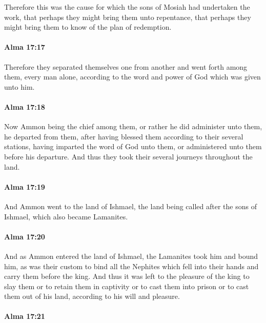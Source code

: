 			Therefore this was the cause
			for which the sons of Mosiah had undertaken the work,
			that perhaps they might bring them unto repentance,
			that perhaps they might bring them to know of the plan of redemption.

		\paragraph{Alma 17:17} %
			\label{ALMA-17-17}

			Therefore they separated themselves one from another
			and went forth among them, every man alone,
			according to the word and power of God which was given unto him.

		\paragraph{Alma 17:18} %
			\label{ALMA-17-18}

			Now Ammon being the chief among them,
			or rather he did administer unto them,
			he departed from them,
			after having blessed them according to their several stations,
			having imparted the word of God unto them,
			or administered unto them before his departure.
			And thus they took their several journeys throughout the land.

		\paragraph{Alma 17:19} %
			\label{ALMA-17-19}

			And Ammon went to the land of Ishmael,
			the land being called after the sons of Ishmael, which also became Lamanites.

		\paragraph{Alma 17:20} %
			\label{ALMA-17-20}

			And as Ammon entered the land of Ishmael,
			the Lamanites took him and bound him,
			as was their custom to bind all the Nephites which fell into their hands
			and carry them before the king.
			And thus it was left to the pleasure of the king to slay them
			or to retain them in captivity
			or to cast them into prison
			or to cast them out of his land,
			according to his will and pleasure.

		\paragraph{Alma 17:21} %
			\label{ALMA-17-21}

